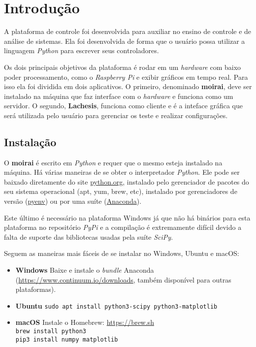 
\chapter{Introdução}%
\label{chapter:introduction}

A plataforma de controle foi desenvolvida para auxiliar no ensino de controle e
de análise de sistemas. Ela foi desenvolvida de forma que o usuário possa
utilizar a linguagem \textit{Python} para escrever seus controladores.

Os dois principais objetivos da plataforma é rodar em um \textit{hardware} com
baixo poder processamento, como o \textit{Raspberry Pi} e exibir gráficos em
tempo real. Para isso ela foi dividida em dois aplicativos. O primeiro, denominado
\textbf{moirai}, deve ser instalado na máquina que faz interface com o
\textit{hardware} e funciona como um servidor. O segundo, \textbf{Lachesis},
funciona como cliente e é a inteface gráfica que será utilizada pelo usuário
para gerenciar os teste e realizar configurações.

\section{Instalação}
\label{sec:installation}

O \textbf{moirai} é escrito em \textit{Python} e requer que o mesmo esteja
instalado na máquina. Há várias maneiras de se obter o interpretador
\textit{Python}. Ele pode ser baixado diretamente do site
\href{https://www.python.org}{python.org}, instalado pelo gerenciador de pacotes
do seu sistema operacional (apt, yum, brew, etc), instalado por gerenciadores de
versão (\href{https://github.com/pyenv/pyenv}{pyenv}) ou por uma suíte
(\href{https://www.continuum.io/downloads}{Anaconda}).

Este último é necessário na plataforma Windows já que não há binários para esta
plataforma no repositório \textit{PyPi} e a compilação é extremamente difícil
devido a falta de suporte das bibliotecas usadas pela suíte \textit{SciPy}.

Seguem as maneiras mais fáceis de se instalar no Windows, Ubuntu e macOS:

\begin{itemize}
\item \textbf{Windows}
        Baixe e instale o \textit{bundle} Anaconda
        (\url{https://www.continuum.io/downloads}, também disponível para outras
        plataformas).

\item \textbf{Ubuntu}
        \texttt{sudo apt install python3-scipy python3-matplotlib}

\item \textbf{macOS}
        Instale o Homebrew: \url{https://brew.sh}\\
        \texttt{brew install python3}\\
        \texttt{pip3 install numpy matplotlib}
\end{itemize}

